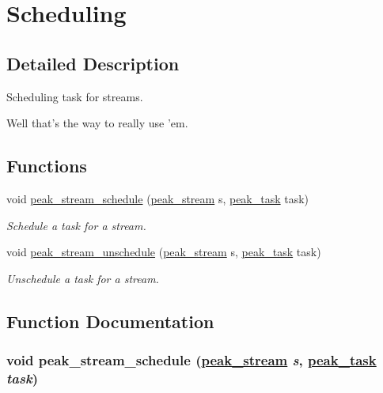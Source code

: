 \hypertarget{group__stream__sched}{
\section{Scheduling}
\label{group__stream__sched}
}


\subsection{Detailed Description}
Scheduling task for streams. 

Well that's the way to really use 'em. 

\subsection*{Functions}
\begin{CompactItemize}
\item 
void \hyperlink{group__stream__sched_ga0}{peak\_\-stream\_\-schedule} (\hyperlink{group__stream_ga0}{peak\_\-stream} s, \hyperlink{group__task__common_ga0}{peak\_\-task} task)
\begin{CompactList}\small\item\em Schedule a task for a stream. \item\end{CompactList}\item 
void \hyperlink{group__stream__sched_ga1}{peak\_\-stream\_\-unschedule} (\hyperlink{group__stream_ga0}{peak\_\-stream} s, \hyperlink{group__task__common_ga0}{peak\_\-task} task)
\begin{CompactList}\small\item\em Unschedule a task for a stream. \item\end{CompactList}\end{CompactItemize}


\subsection{Function Documentation}
\hypertarget{group__stream__sched_ga0}{
\subsubsection[peak\_\-stream\_\-schedule]{\setlength{\rightskip}{0pt plus 5cm}void peak\_\-stream\_\-schedule (\hyperlink{group__stream_ga0}{peak\_\-stream} {\em s}, \hyperlink{group__task__common_ga0}{peak\_\-task} {\em task})}}
\label{group__stream__sched_ga0}


